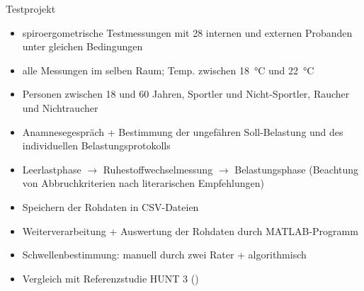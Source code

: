 \documentclass[colorBG,slideColor,8pt]{beamer}
\begin{document}
\begin{frame}{Testprojekt}
\begin{itemize}
	\item spiroergometrische Testmessungen mit 28 internen und externen Probanden unter gleichen Bedingungen
	\item alle Messungen im selben Raum; Temp. zwischen \SI{18}{\degreeCelsius} und \SI{22}{\degreeCelsius}
	\item Personen zwischen 18 und 60 Jahren, Sportler und Nicht-Sportler, Raucher und Nichtraucher
	\item Anamnesegespräch + Bestimmung der ungefähren Soll-Belastung und des individuellen Belastungsprotokolls
	\item Leerlastphase $\rightarrow$ Ruhestoffwechselmessung $\rightarrow$ Belastungsphase (Beachtung von Abbruchkriterien nach literarischen Empfehlungen)
	\item Speichern der Rohdaten in CSV-Dateien
	\item Weiterverarbeitung + Auswertung der Rohdaten durch MATLAB-Programm
	\item Schwellenbestimmung: manuell durch zwei Rater + algorithmisch
	\item Vergleich mit Referenzstudie HUNT 3 (\cite{Loe.2014})
\end{itemize}
\end{frame}
\end{document}
